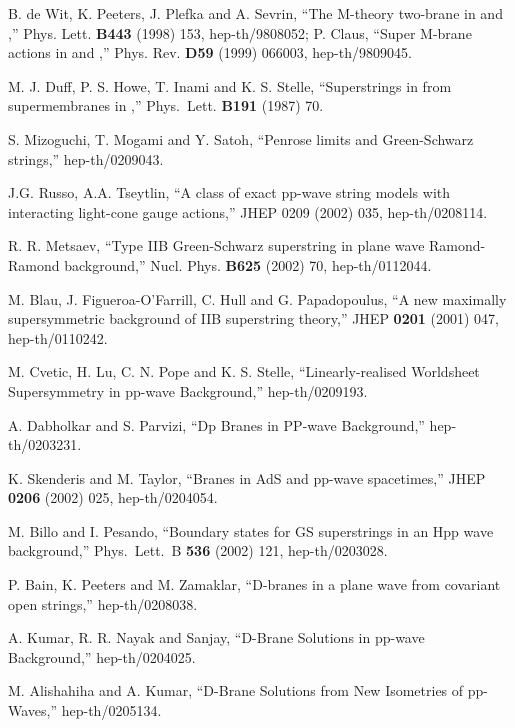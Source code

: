 \documentclass[a4paper,12pt]{article}
\begin{document}
\begin{thebibliography}{99}
 B. de Wit, K. Peeters, J. Plefka and A. Sevrin, ``The
  M-theory two-brane in \coordHE{} and \coordHE{},''
  Phys. Lett. {\bf B443} (1998) 153, hep-th/9808052; P. Claus, ``Super
  M-brane actions in \coordHE{} and \coordHE{},''
  Phys. Rev. {\bf D59} (1999) 066003, hep-th/9809045.

 M. J. Duff, P. S. Howe, T. Inami and K. S. Stelle,
  ``Superstrings in \coordHE{} from supermembranes in \coordHE{},''
  Phys.~Lett.  {\bf B191} (1987) 70.

 S. Mizoguchi, T. Mogami and Y. Satoh, ``Penrose
  limits and Green-Schwarz strings,'' hep-th/0209043.

 J.G. Russo, A.A. Tseytlin, ``A class of exact pp-wave 
string models with interacting light-cone gauge actions,''
JHEP 0209 (2002) 035, hep-th/0208114.

 R. R. Metsaev, ``Type IIB Green-Schwarz superstring
  in plane wave Ramond-Ramond background,'' Nucl. Phys.  {\bf B625}
  (2002) 70, hep-th/0112044.
 
 M. Blau, J. Figueroa-O'Farrill, C. Hull and G.
  Papadopoulus, ``A new maximally supersymmetric background of IIB
  superstring theory,'' JHEP {\bf 0201} (2001) 047, hep-th/0110242.
   
 M. Cvetic, H. Lu, C. N. Pope and K. S. Stelle,
  ``Linearly-realised Worldsheet Supersymmetry in pp-wave
  Background,'' hep-th/0209193.

 A. Dabholkar and S. Parvizi, ``Dp Branes in PP-wave
  Background,'' hep-th/0203231.
  
 K. Skenderis and M. Taylor, ``Branes in AdS and
  pp-wave spacetimes,'' JHEP {\bf 0206} (2002) 025, hep-th/0204054.

 M. Billo and I. Pesando, ``Boundary states for GS
superstrings in an Hpp wave background,'' Phys.\ Lett.\ B {\bf 536}
(2002) 121, hep-th/0203028.

 P. Bain, K. Peeters and M. Zamaklar, ``D-branes in a
plane wave from covariant open strings,'' hep-th/0208038.

 A. Kumar, R. R. Nayak and Sanjay, ``D-Brane Solutions
  in pp-wave Background,'' hep-th/0204025.
  
 M. Alishahiha and A. Kumar, ``D-Brane Solutions from
  New Isometries of pp-Waves,'' hep-th/0205134.


\end{thebibliography}
\end{document}
